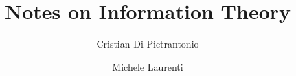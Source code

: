 \documentclass[a4paper,oneside]{memoir}
\title{Notes on Information Theory}
\author{Cristian Di Pietrantonio \and Michele Laurenti}
\begin{document}
	\frontmatter
	\maketitle
	\tableofcontents*
	
	\mainmatter
	
	
	
	
	
	
	
\end{document}
